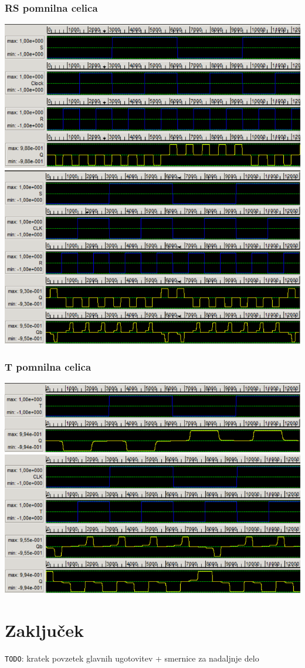 \documentclass[a4paper, 11pt]{article}
\newcommand{\todo}{\textcolor{BrickRed}{\texttt{TODO}}} %
\begin{document}
\subsubsection{RS pomnilna celica}
\includegraphics[scale=0.5]{../img/vir_4/sim_sr.png} \\
\includegraphics[scale=0.5]{../img/vir_5/sim_rs.png}

\subsubsection{T pomnilna celica}
\includegraphics[scale=0.5]{../img/vir_4/sim_t.png} \\
\includegraphics[scale=0.5]{../img/vir_5/sim_t.png} 

\section{Zaključek}
\todo: kratek povzetek glavnih ugotovitev + smernice za nadaljnje delo


 
\end{document}
